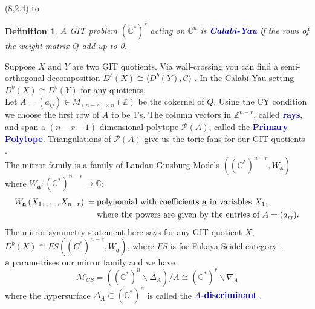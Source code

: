 \documentclass[a0]{a0poster}
\newtheorem{defn}{Definition}
\def\Head#1{\noindent\hbox to \hsize{\hfil{\LARGE\color{DarkBlue}\sf #1}}\bigskip}
\begin{document}
\begin{textblock}{7}(8,2.4)
\Head{Calabi-Yau Toric GIT}
\sf
\begin{defn}
  A GIT problem $(\mathbb{C}^*)^r$ acting on $\mathbb{C}^n$ is \textcolor{DarkBlue}{\textbf{Calabi-Yau}} if the rows of the weight matrix $Q$ add up to 0.
\end{defn}
Suppose $X$ and $Y$ are two GIT quotients. Via wall-crossing you can find a semi-orthogonal decomposition $D^b(X) \cong\langle D^b(Y), \mathcal{C} \rangle$ \cite{derivedgit}. In the Calabi-Yau setting $D^b(X) \cong D^b(Y)$ for any quotients. 
\vspace*{0.7cm} 
\\
Let $A = (a_{ij}) \in M_{(n-r)\times n}(\mathbb{Z})$ be the cokernel of $Q$. Using the CY condition we choose the first row of $A$ to be 1's. The column vectors in $\mathbb{Z}^{n-r}$, called \textcolor{DarkBlue}{\textbf{rays}}, and span a $(n-r-1)$ dimensional polytope $\mathcal{P}(A)$, called the \textcolor{DarkBlue}{\textbf{Primary Polytope}}. Triangulations of $\mathcal{P}(A)$ give us the toric fans for our GIT quotients \cite[Section 4]{coates2018crepant}.
\vspace*{0.7cm} 
\\
The mirror family is a family of Landau Ginsburg Models \cite{cox1999mirror} $\left( (C^*)^{n-r}, W_{\underline{\textbf{a}}} \right)$ where $W_{\underline{\textbf{a}}} : (\mathbb{C}^*)^{n-r} \to \mathbb{C}$:
\begin{align*}
  W_{\underline{\textbf{a}}} \left(X_1, \dots, X_{n-r}\right)  \:= \:&\text{polynomial with coefficients \underline{\textbf{a}} in variables $X_1$}, \\
  &\text{where the powers are given by the entries of } A = (a_{ij}).
\end{align*}
The mirror symmetry statement here says for any GIT quotient $X$,
$D^b(X) \cong FS\left( (C^*)^{n-r}, W_{\underline{\textbf{a}}} \right)$,
where $FS$ is for Fukaya-Seidel category \cite{seidelfukaya}.
\vspace*{0.7cm} 
\\
 $\textbf{a}$ parametrises our mirror family and we have
 $$
\mathcal{M}_{CS} = \left(  (\mathbb{C}^*)^n \backslash \Delta_A \right)/ A \cong (\mathbb{C}^*)^r \backslash \nabla_A
$$
 where the hypersurface $\Delta_A \subset (\mathbb{C}^*)^n$ is called the \textcolor{DarkBlue}{\textbf{$A$-discriminant}} \cite{gelfand1994discriminants}.

\end{textblock}
\end{document}
